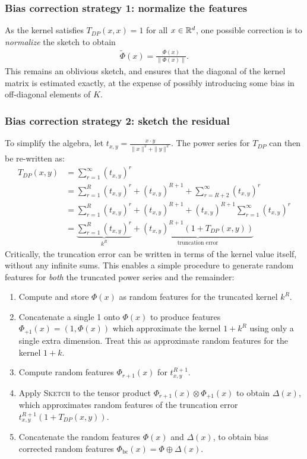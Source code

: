 \subsubsection{Bias correction strategy 1: normalize the features}

As the kernel satisfies $T_{DP}(x,x)=1$ for all $x\in\mathbb{R}^d$, one possible correction is to \emph{normalize} the sketch to obtain
\begin{align*}
\tilde \Phi(x) = \frac{\Phi(x)}{\|\Phi(x)\|}.
\end{align*}
This remains an oblivious sketch, and ensures that the diagonal of the kernel matrix is estimated exactly, at the expense of possibly introducing some bias in off-diagonal elements of $K$.

\subsubsection{Bias correction strategy 2: sketch the residual}

To simplify the algebra,
let $t_{x,y}=\frac{x\cdot y}{\|x\|^2 + \|y\|^2}$.
The power series for $T_{DP}$ can then be re-written as:
\begin{align}
    T_{DP}(x,y) &= \sum_{r=1}^\infty \left(t_{x,y}\right)^r \nonumber\\
    &= \sum_{r=1}^{R} \left(t_{x,y}\right)^r + \left(t_{x,y}\right)^{R+1} + \sum_{r=R+2}^{\infty} \left(t_{x,y}\right)^r \nonumber\\
    &= \sum_{r=1}^{R} \left(t_{x,y}\right)^r + \left(t_{x,y}\right)^{R+1} + \left(t_{x,y}\right)^{R+1}\sum_{r=1}^{\infty} \left(t_{x,y}\right)^r \nonumber\\
    &= \underbrace{\sum_{r=1}^{R} \left(t_{x,y}\right)^r}_{k^{R}} + \underbrace{\left(t_{x,y}\right)^{R+1} \left(1 + T_{DP}(x,y)\right)}_{\text{truncation error}}
\end{align}
Critically, the truncation error can be written in terms of the kernel value itself, without any infinite sums.
This enables a simple procedure to generate random features for \emph{both} the truncated
power series and the remainder:
\begin{enumerate}
    \item Compute and store $\Phi(x)$ 
        as random features for the truncated kernel $k^{R}$.
    \item  Concatenate a single 1 onto $\Phi(x)$
        to produce features $\Phi_{+1}(x) = (1,\Phi(x))$ which approximate the kernel $1+k^{R}$
        using only a single extra dimension.
        Treat this as approximate random features for the kernel $1+k$.
    \item Compute random features $\Phi_{r+1}(x)$ for $t_{x,y}^{R+1}$.
    \item Apply \textsc{Sketch} to the tensor product $\Phi_{r+1}(x)\otimes \Phi_{+1}(x)$ to obtain $\Delta(x)$,
        which approximates random features of the truncation error 
        $t_{x,y}^{R+1}(1+T_{DP}(x,y))$.
    \item Concatenate the random features $\Phi(x)$ and $\Delta(x)$, to obtain bias corrected random features $\Phi_\text{bc}(x)=\Phi\oplus \Delta(x)$.
\end{enumerate}

